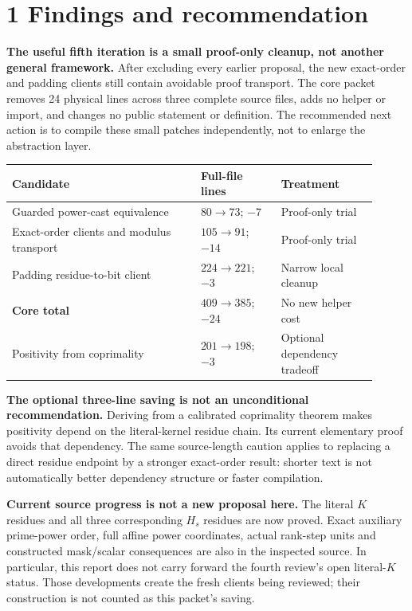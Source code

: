 \section*{1 Findings and recommendation}
\textbf{The useful fifth iteration is a small proof-only cleanup, not another general framework.}
After excluding every earlier proposal, the new exact-order and padding clients still contain avoidable proof transport. The core packet removes 24 physical lines across three complete source files, adds no helper or import, and changes no public statement or definition. The recommended next action is to compile these small patches independently, not to enlarge the abstraction layer.

\begin{tabular}{@{}L{0.47\linewidth}L{0.20\linewidth}L{0.24\linewidth}@{}}\toprule
Candidate & Full-file lines & Treatment\\\midrule
Guarded power-cast equivalence & $80\to73$; $-7$ & Proof-only trial\\[4pt]
Exact-order clients and modulus transport & $105\to91$; $-14$ & Proof-only trial\\[4pt]
Padding residue-to-bit client & $224\to221$; $-3$ & Narrow local cleanup\\[4pt]
\textbf{Core total} & $409\to385$; $-24$ & No new helper cost\\[4pt]
Positivity from coprimality & $201\to198$; $-3$ & Optional dependency tradeoff\\\bottomrule
\end{tabular}

\textbf{The optional three-line saving is not an unconditional recommendation.}
Deriving  from a calibrated coprimality theorem makes positivity depend on the literal-kernel residue chain. Its current elementary proof avoids that dependency. The same source-length caution applies to replacing a direct residue endpoint by a stronger exact-order result: shorter text is not automatically better dependency structure or faster compilation.

\textbf{Current source progress is not a new proposal here.} The literal $K$ residues and all three corresponding $H_s$ residues are now proved. Exact auxiliary prime-power order, full affine power coordinates, actual rank-step units and constructed mask/scalar consequences are also in the inspected source. In particular, this report does not carry forward the fourth review's open literal-$K$ status. Those developments create the fresh clients being reviewed; their construction is not counted as this packet's saving.

